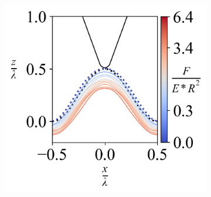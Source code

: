 \begin{figure}[H]
\begin{subfigure}{0.32\textwidth}
    \end{subfigure}
    \hfill     
    \begin{subfigure}{0.32\textwidth}
        \centering
        \caption{\label{fig: All-Wave-LineContour-1}}
        \includegraphics[width=1\linewidth]{Figures/Wave-LineContour-1.png}
    \end{subfigure}



    \hfill
    \vspace{-0.3in}



\end{figure}
